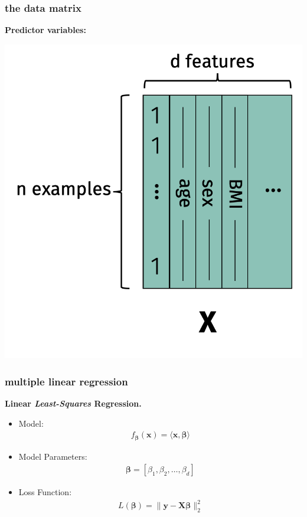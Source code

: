 \documentclass[handout,compress]{beamer}
\newcommand{\bs}[1]{\boldsymbol{#1}}
\newcommand{\bv}[1]{\mathbf{#1}}
\begin{document}
\begin{frame}
	\frametitle{the data matrix}
	\textbf{Predictor variables:}
	\begin{center}
		\includegraphics[width=.45\textwidth]{data_matrix_features.png}
	\end{center}
\end{frame}

\begin{frame}
	\frametitle{multiple linear regression}
	\begin{center}
		\textbf{Linear \emph{Least-Squares} Regression.}
	\end{center}
	\begin{itemize}
		\item Model: 
		\begin{align*}
		f_{\bs{\beta}}(\bv{x}) = \langle\bv{x},\bs{\beta}\rangle
		\end{align*}
		\item Model Parameters: 
		\begin{align*}
		\bs{\beta} = \left[\beta_1, \beta_2, \ldots, \beta_d \right]
		\end{align*}
		\item Loss Function:
		\begin{align*}
		L(\bs{\beta}) = \|\bv{y} -\bv{X}\bs{\beta}\|_2^2
		\end{align*}
	\end{itemize}
\end{frame}
\end{document}
